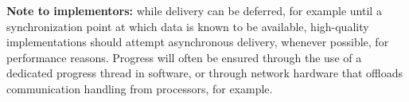 \textbf{Note to implementors:} while delivery can be deferred, for example until a synchronization point at which data is known to be available, high-quality implementations should attempt asynchronous delivery, whenever possible, for performance reasons. Progress will often be ensured through the use of a dedicated progress thread in software, or through
network hardware that offloads communication handling from processors, for example.





